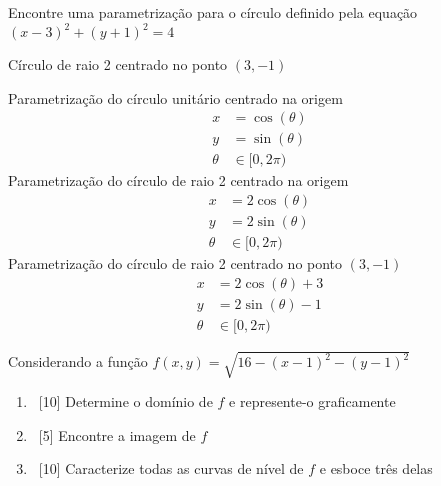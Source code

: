 \documentclass[a4paper,12pt,fleqn]{article}
\begin{document}

Encontre uma parametrização para o círculo definido pela equação
\( (x-3)^2 + (y+1)^2 = 4\)
\clearpagequestiononly

\begin{answer}
  Círculo de raio 2 centrado no ponto \((3, -1)\)

  Parametrização do círculo unitário centrado na origem
  \begin{align*}
    x      & = \cos(\theta) \\
    y      & = \sin(\theta) \\
    \theta & \in [0, 2\pi)
  \end{align*}
  Parametrização do círculo de raio 2 centrado na origem
  \begin{align*}
    x      & = 2\cos(\theta) \\
    y      & = 2\sin(\theta) \\
    \theta & \in [0, 2\pi)
  \end{align*}
  Parametrização do círculo de raio 2 centrado no ponto \((3, -1)\)
  \begin{align*}
  x      & = 2\cos(\theta) + 3 \\
  y      & = 2\sin(\theta) - 1 \\
  \theta & \in [0, 2\pi)
  \end{align*}
\end{answer}

Considerando a função
\(
  f(x,y) = \sqrt{16 - (x-1)^2 - (y-1)^2}
\)
\begin{enumerate}[label=(\alph*)]
  \item \ [10] Determine o domínio de $f$ e represente-o graficamente
  \item \ [5] Encontre a imagem de $f$
  \item \ [10] Caracterize todas as curvas de nível de $f$ e esboce três delas
\end{enumerate}
\clearpagequestiononly
\end{document}
